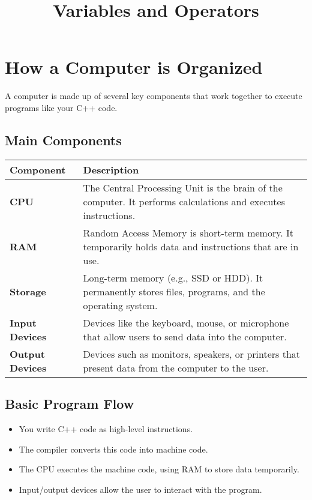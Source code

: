 \documentclass{article}
\title{Variables and Operators}
\author{}
\date{}
\begin{document}
\maketitle

\section{How a Computer is Organized}

A computer is made up of several key components that work together to execute programs like your C++ code.

\subsection*{Main Components}

\renewcommand{\arraystretch}{1.5} %
\setlength{\tabcolsep}{12pt}      %

\begin{center}
\begin{tabular}{|l|p{9cm}|}
\hline
\rowcolor{lightgray} \textbf{Component} & \textbf{Description} \\
\hline
\textbf{CPU} & The Central Processing Unit is the brain of the computer. It performs calculations and executes instructions. \\
\hline
\textbf{RAM} & Random Access Memory is short-term memory. It temporarily holds data and instructions that are in use. \\
\hline
\textbf{Storage} & Long-term memory (e.g., SSD or HDD). It permanently stores files, programs, and the operating system. \\
\hline
\textbf{Input Devices} & Devices like the keyboard, mouse, or microphone that allow users to send data into the computer. \\
\hline
\textbf{Output Devices} & Devices such as monitors, speakers, or printers that present data from the computer to the user. \\
\hline
\end{tabular}
\end{center}

\subsection*{Basic Program Flow}
\begin{itemize}
    \item You write C++ code as high-level instructions.
    \item The compiler converts this code into machine code.
    \item The CPU executes the machine code, using RAM to store data temporarily.
    \item Input/output devices allow the user to interact with the program.
\end{itemize}
\end{document}

